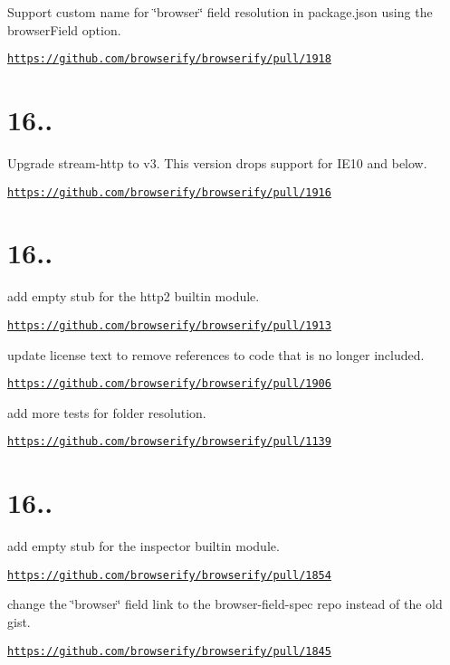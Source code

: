 Support custom name for {\ttfamily \char`\"{}browser\char`\"{}} field resolution in {\ttfamily package.\+json} using the {\ttfamily browser\+Field} option.

\href{https://github.com/browserify/browserify/pull/1918}{\tt https\+://github.\+com/browserify/browserify/pull/1918}

\section*{16..}

Upgrade stream-\/http to v3. This version drops support for I\+E10 and below.

\href{https://github.com/browserify/browserify/pull/1916}{\tt https\+://github.\+com/browserify/browserify/pull/1916}

\section*{16..}

add empty stub for the {\ttfamily http2} builtin module.

\href{https://github.com/browserify/browserify/pull/1913}{\tt https\+://github.\+com/browserify/browserify/pull/1913}

update license text to remove references to code that is no longer included.

\href{https://github.com/browserify/browserify/pull/1906}{\tt https\+://github.\+com/browserify/browserify/pull/1906}

add more tests for folder resolution.

\href{https://github.com/browserify/browserify/pull/1139}{\tt https\+://github.\+com/browserify/browserify/pull/1139}

\section*{16..}

add empty stub for the {\ttfamily inspector} builtin module.

\href{https://github.com/browserify/browserify/pull/1854}{\tt https\+://github.\+com/browserify/browserify/pull/1854}

change the \char`\"{}browser\char`\"{} field link to the browser-\/field-\/spec repo instead of the old gist.

\href{https://github.com/browserify/browserify/pull/1845}{\tt https\+://github.\+com/browserify/browserify/pull/1845}

